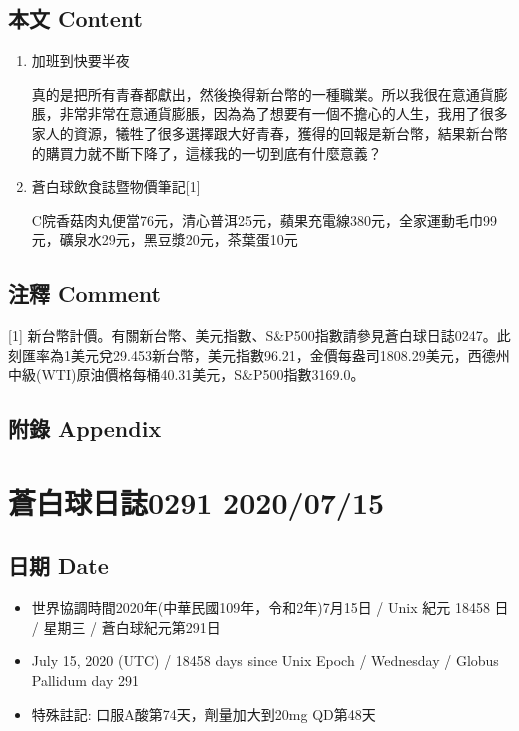 \documentclass[
]{article}
\providecommand{\tightlist}{%
  \setlength{\itemsep}{0pt}\setlength{\parskip}{0pt}}
\begin{document}
\hypertarget{ux672cux6587-content-12}{%
\subsection{本文 Content}\label{ux672cux6587-content-12}}

\begin{enumerate}
\def\labelenumi{\arabic{enumi}.}
\item
  加班到快要半夜

  真的是把所有青春都獻出，然後換得新台幣的一種職業。所以我很在意通貨膨脹，非常非常在意通貨膨脹，因為為了想要有一個不擔心的人生，我用了很多家人的資源，犧牲了很多選擇跟大好青春，獲得的回報是新台幣，結果新台幣的購買力就不斷下降了，這樣我的一切到底有什麼意義？
\item
  蒼白球飲食誌暨物價筆記{[}1{]}

  C院香菇肉丸便當76元，清心普洱25元，蘋果充電線380元，全家運動毛巾99元，礦泉水29元，黑豆漿20元，茶葉蛋10元
\end{enumerate}

\hypertarget{ux6ce8ux91cb-comment-12}{%
\subsection{注釋 Comment}\label{ux6ce8ux91cb-comment-12}}

{[}1{]}
新台幣計價。有關新台幣、美元指數、S\&P500指數請參見蒼白球日誌0247。此刻匯率為1美元兌29.453新台幣，美元指數96.21，金價每盎司1808.29美元，西德州中級(WTI)原油價格每桶40.31美元，S\&P500指數3169.0。

\hypertarget{ux9644ux9304-appendix-12}{%
\subsection{附錄 Appendix}\label{ux9644ux9304-appendix-12}}

\hypertarget{ux84bcux767dux7403ux65e5ux8a8c0291-20200715}{%
\section{蒼白球日誌0291
2020/07/15}\label{ux84bcux767dux7403ux65e5ux8a8c0291-20200715}}

\hypertarget{ux65e5ux671f-date-13}{%
\subsection{日期 Date}\label{ux65e5ux671f-date-13}}

\begin{itemize}
\tightlist
\item
  世界協調時間2020年(中華民國109年，令和2年)7月15日 / Unix 紀元 18458 日
  / 星期三 / 蒼白球紀元第291日
\item
  July 15, 2020 (UTC) / 18458 days since Unix Epoch / Wednesday / Globus
  Pallidum day 291
\item
  特殊註記: 口服A酸第74天，劑量加大到20mg QD第48天
\end{itemize}
\end{document}

